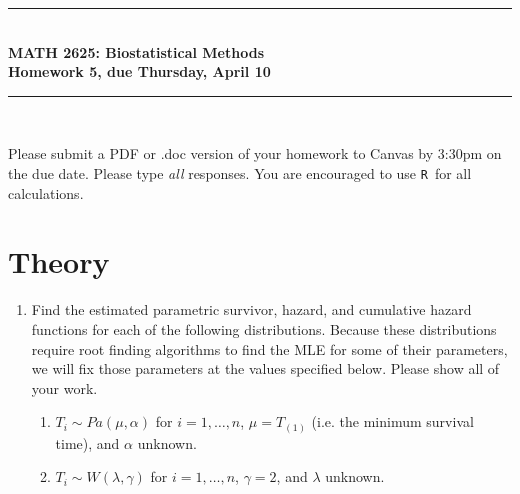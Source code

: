 \documentclass{article}
\newcommand{\HRule}{\rule{\linewidth}{0.5mm}}
\newcommand{\R}{\texttt{R}}
\begin{document}
	\begin{center}
		\HRule \\[0.1cm]
		\vspace{0.1cm}
		{ \LARGE \bfseries MATH 2625: Biostatistical Methods\\[0.5cm] Homework 5, due Thursday, April 10 } \\[0.1cm]
		\HRule \\[0.1cm]
	\end{center}
	
		Please submit a PDF or .doc version of your homework to Canvas by 3:30pm on the due date. Please type \emph{all} responses. You are encouraged to use \R\ for all calculations.
		
	\section*{Theory}
	\begin{enumerate}
		\item Find the estimated parametric survivor, hazard, and cumulative hazard functions for each of the following distributions. Because these distributions require root finding algorithms to find the MLE for some of their parameters, we will fix those parameters at the values specified below. Please show all of your work.
		\begin{enumerate}
			\item $T_i \sim Pa(\mu, \alpha)$ for $i = 1, \ldots, n$, $\mu = T_{(1)}$ (i.e. the minimum survival time), and $\alpha$ unknown.
			\item $T_i \sim W(\lambda, \gamma)$  for $i = 1, \ldots, n$, $\gamma = 2$, and $\lambda$ unknown.
		\end{enumerate}
	\end{enumerate}
\end{document}
